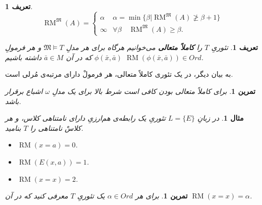 \documentclass[12pt,a4paper]{report}
\theoremstyle{colorhead}
\newtheorem{tam}[thm]{تمرین}
\newtheorem{mesal}[thm]{مثال}
\newtheorem{defn}[thm]{تعریف}
\DeclareMathOperator{\RM}{RM}
\begin{document}
\begin{defn}
\[
\RM^\mathfrak{M}(A)=\begin{cases}
\alpha & \alpha=\min\{\beta|\RM^\mathfrak{M}(A)\not\geq \beta+1\}
\\
\infty & \forall\beta \quad \RM^\mathfrak{M}(A)\geq \beta.
\end{cases}
\]
\end{defn}
\begin{defn}
تئوریِ
$T$
را
\textbf{ کاملاً متعالی}
  می‌خوانیم هرگاه برای هر مدلِ
$\mathfrak{M}\models T$
و هر
فرمولِ
$\phi(\bar{x},\bar{a})$
که در آن
$\bar{a}\in M$
داشته باشیم
$\RM(\phi(\bar{x},\bar{a}))\in Ord$.
\end{defn}
به بیان دیگر، در یک تئوری کاملاً متعالی، هر فرمولْ دارای مرتبه‌ی مُرلی است. 
\begin{tam}
برای کاملاً متعالی بودن
کافی است شرط بالا برای یک مدلِ
$\omega$
اشباع 
برقرار باشد.
\end{tam}
\begin{mesal}
در زبانِ
$L=\{E\}$
تئوریِ
یک رابطه‌ی هم‌ارزیِ دارای نامتناهی کلاس، و هر کلاسْ نامتناهی را 
$T$
بنامید. 
\begin{itemize}
\item 
$\RM(x=a)=0$.
\item 
$\RM(E(x,a))=1$.
\item 
$\RM(x=x)=2$.
\end{itemize}
\end{mesal}
\begin{tam}
برای هر
$\alpha\in Ord$
یک تئوریِ
$T$
معرفی کنید که در آن
$\RM(x=x)=\alpha$.
\end{tam}
\pagebreak
\end{document}
